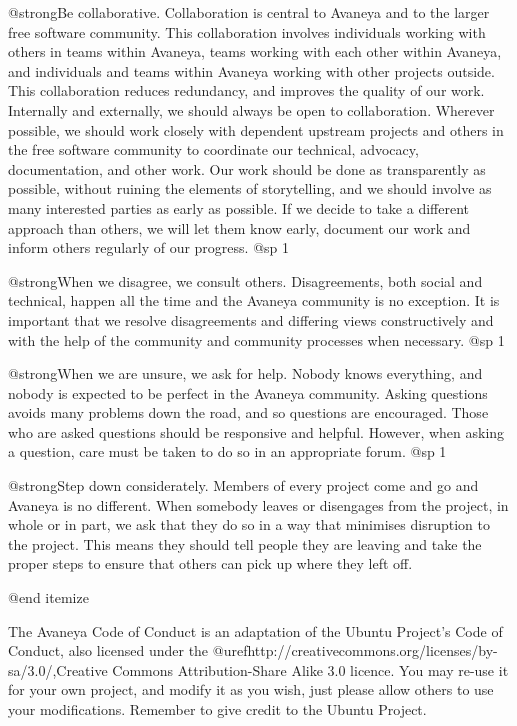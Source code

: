 \item
@strong{Be collaborative.} Collaboration is central to Avaneya and to
the larger free software community. This collaboration involves
individuals working with others in teams within Avaneya, teams working
with each other within Avaneya, and individuals and teams within
Avaneya working with other projects outside. This collaboration
reduces redundancy, and improves the quality of our work. Internally
and externally, we should always be open to collaboration. Wherever
possible, we should work closely with dependent upstream projects and
others in the free software community to coordinate our technical,
advocacy, documentation, and other work. Our work should be done as
transparently as possible, without ruining the elements of
storytelling, and we should involve as many interested parties as
early as possible. If we decide to take a different approach than
others, we will let them know early, document our work and inform
others regularly of our progress.
@sp 1

\item
@strong{When we disagree, we consult others.} Disagreements, both
social and technical, happen all the time and the Avaneya community is
no exception. It is important that we resolve disagreements and
differing views constructively and with the help of the community and
community processes when necessary.
@sp 1

\item
@strong{When we are unsure, we ask for help.} Nobody knows everything,
and nobody is expected to be perfect in the Avaneya community. Asking
questions avoids many problems down the road, and so questions are
encouraged. Those who are asked questions should be responsive and
helpful. However, when asking a question, care must be taken to do so
in an appropriate forum.
@sp 1

\item
@strong{Step down considerately.} Members of every project come and go
and Avaneya is no different. When somebody leaves or disengages from
the project, in whole or in part, we ask that they do so in a way that
minimises disruption to the project. This means they should tell
people they are leaving and take the proper steps to ensure that
others can pick up where they left off.

@end itemize

The Avaneya Code of Conduct is an adaptation of the Ubuntu Project's
Code of Conduct, also licensed under the
@uref{http://creativecommons.org/licenses/by-sa/3.0/,Creative Commons Attribution-Share Alike 3.0} 
licence. You may re-use it for your own project, and modify it as you
wish, just please allow others to use your modifications. Remember to
give credit to the Ubuntu Project.

